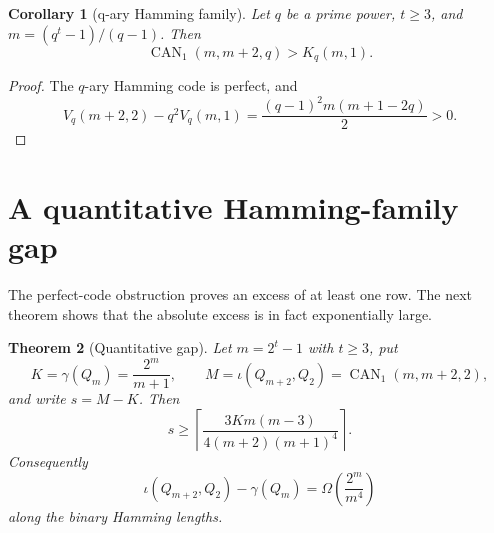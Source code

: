 \documentclass[11pt]{article}
\newtheorem{theorem}{Theorem}[section]
\newtheorem{corollary}[theorem]{Corollary}
\theoremstyle{definition}
\theoremstyle{remark}
\newcommand{\CAN}{\operatorname{CAN}}
\newcommand{\Kcov}{K}
\newcommand{\Vol}{V}
\begin{document}
\begin{corollary}[q-ary Hamming family]\label{cor:qary-hamming}
Let $q$ be a prime power, $t\ge3$, and
$m=(q^t-1)/(q-1)$.  Then
\[
 \CAN_1(m,m+2,q)>\Kcov_q(m,1).
\]
\end{corollary}

\begin{proof}
The $q$-ary Hamming code is perfect, and
\[
 \Vol_q(m+2,2)-q^2\Vol_q(m,1)
 =\frac{(q-1)^2m(m+1-2q)}2>0.
\]
\end{proof}

\section{A quantitative Hamming-family gap}

The perfect-code obstruction proves an excess of at least one row.  The next
theorem shows that the absolute excess is in fact exponentially large.

\begin{theorem}[Quantitative gap]\label{thm:quantitative-gap}
Let $m=2^t-1$ with $t\ge3$, put
\[
 K=\gamma(Q_m)=\frac{2^m}{m+1},
 \qquad
 M=\iota(Q_{m+2},Q_2)=\CAN_1(m,m+2,2),
\]
and write $s=M-K$.  Then
\[
 s\ge
 \left\lceil
 \frac{3K m(m-3)}{4(m+2)(m+1)^4}
 \right\rceil.
\]
Consequently
\[
 \iota(Q_{m+2},Q_2)-\gamma(Q_m)
 =\Omega\!\left(\frac{2^m}{m^4}\right)
\]
along the binary Hamming lengths.
\end{theorem}
\end{document}
